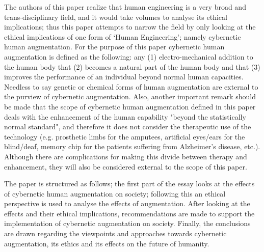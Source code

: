 The authors of this paper realize that human engineering is a very broad and trans-disciplinary field, and it would take volumes to analyse its ethical implications; thus this paper attempts to narrow the field by only looking at the ethical implications of one form of ‘Human Engineering’; namely cybernetic human augmentation. For the purpose of this paper cybernetic human augmentation is defined as the following: any (1) electro-mechanical addition to the human body that (2) becomes a natural part of the human body and that (3) improves the performance of an individual beyond normal human capacities. Needless to say genetic or chemical forms of human augmentation are external to the purview of cybernetic augmentation. Also, another important remark should be made that the scope of cybernetic human augmentation defined in this paper deals with the enhancement of the human capability "beyond the statistically normal standard", and therefore it does not consider the therapeutic use of the technology (e.g. prosthetic limbs for the amputees, artificial eyes/ears for the blind/deaf, memory chip for the patients suffering from Alzheimer's disease, etc.). Although there are complications for making this divide between therapy and enhancement, they will also be considered external to the scope of this paper.

The paper is structured as follows; the first part of the essay looks at the effects of cybernetic human augmentation on society; following this an ethical perspective is used to analyse the effects of augmentation. After looking at the effects and their ethical implications, recommendations are made to support the implementation of cybernetic augmentation on society. Finally, the conclusions are drawn regarding the viewpoints and approaches towards cybernetic augmentation, its ethics and its effects on the future of humanity.